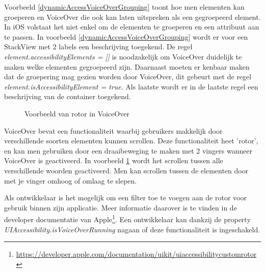 Voorbeeld \ref{dynamicAccessVoiceOverGrouping} toont hoe men elementen kan groeperen en VoiceOver die ook kan laten uitspreken als een gegroepeerd element. In iOS volstaat het niet enkel om de elementen te groeperen en een attribuut aan te passen. In voorbeeld \ref{dynamicAccessVoiceOverGrouping} wordt er voor een StackView met 2 labels een beschrijving toegekend. De regel \emph{element.accessibilityElements = []} is noodzakelijk om VoiceOver duidelijk te maken welke elementen gegroepeerd zijn. Daarnaast moeten er kenbaar maken dat de groepering mag gezien worden door VoiceOver, dit gebeurt met de regel \emph{element.isAccessibilityElement = true}. Als laatste wordt er in de laatste regel een beschrijving van de container toegekend.
\newpage
   \begin{figure}[h]
    \centering
    \caption{Voorbeeld van rotor in VoiceOver }
    \label{fig:voiceOverRotor}
\end{figure}
VoiceOver bevat een functionaliteit waarbij gebruikers makkelijk door verschillende soorten elementen kunnen scrollen. Deze functionaliteit heet 'rotor', en kan men gebruiken door een draaibeweging te maken met 2 vingers wanneer VoiceOver is geactiveerd. In voorbeeld \ref{fig:voiceOverRotor} wordt het scrollen tussen alle verschillende woorden geactiveerd. Men kan scrollen tussen de elementen door met je vinger omhoog of omlaag te slepen.

Als ontwikkelaar is het mogelijk om een filter toe te voegen aan de rotor voor gebruik binnen zijn applicatie.  Meer informatie daarover is te vinden in de developer documentatie van Apple\footnote{\url{https://developer.apple.com/documentation/uikit/uiaccessibilitycustomrotor}}. Een ontwikkelaar kan dankzij de property \emph{UIAccessibility.isVoiceOverRunning} nagaan of deze functionaliteit is ingeschakeld. 

